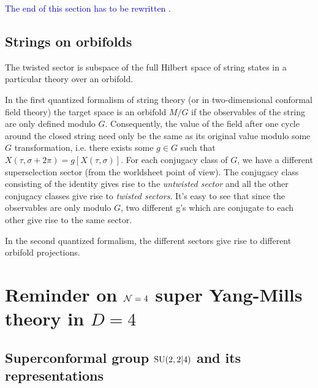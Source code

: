         \textcolor{blue}{The end of this section has to be rewritten \marker.}

    \subsection{Strings on orbifolds}

        The twisted sector is subspace of the full Hilbert space of string states in a particular theory over an orbifold. 
        
        In the first quantized formalism of string theory (or in two-dimensional conformal field theory) the target space is an orbifold $M/G$ if the observables of the string are only defined modulo $G$. Consequently, the value of the field after one cycle around the closed string need only be the same as its original value modulo some $G$ transformation, i.e. there exists some $g\in G$ such that $X(\tau,\sigma+2\pi)=g[X(\tau,\sigma)]$. For each conjugacy class of $G$, we have a different superselection sector (from the worldsheet point of view). The conjugacy class consisting of the identity gives rise to the \emph{untwisted sector} and all the other conjugacy classes give rise to \emph{twisted sectors}. It's easy to see that since the observables are only modulo $G$, two different g's which are conjugate to each other give rise to the same sector.

        In the second quantized formalism, the different sectors give rise to different orbifold projections.

\section{Reminder on $\mathcal{N}=4$ super Yang-Mills theory in $D=4$}\label{sec:N4SCFT}

    \subsection{Superconformal group $\text{SU}(2,2|4)$ and its representations}

